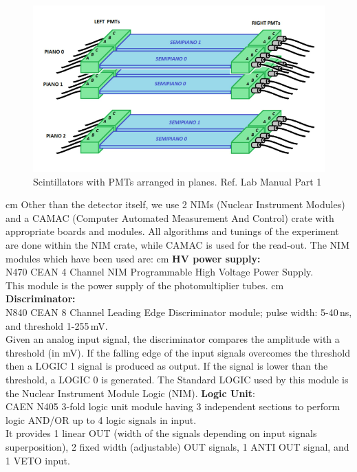	\begin{figure}
		\centering
		\includegraphics[width=1\textwidth]{figures/33.png}
		\caption{Scintillators with PMTs arranged in planes. Ref. Lab Manual Part 1}
		\label{fig:Setup}
	\end{figure}
	 cm
	Other than the detector itself, we use 2 NIMs (Nuclear Instrument Modules) and a 
    CAMAC (Computer Automated Measurement And Control) crate with appropriate boards and modules.
    All algorithms and tunings of the experiment are done within the NIM crate, while CAMAC is used
    for the read-out. The NIM modules which have been used are: 
	 cm
	\textbf{HV power supply:}\\ N470 CEAN 4 Channel NIM Programmable High Voltage
    Power Supply.\\
	This module is the power supply of the photomultiplier tubes.
	 cm
	\textbf{Discriminator:}\\ N840 CEAN 8 Channel Leading Edge Discriminator module; pulse width:
    5-40\,ns, and threshold 1-255\,mV.\\
	Given an analog input signal, the discriminator compares the amplitude with a threshold 
    (in mV). If the falling edge of the input signals overcomes the threshold
    then a LOGIC 1 signal is produced as output. If the signal is lower than the threshold,
    a LOGIC 0 is generated. The Standard LOGIC used by this module is the Nuclear Instrument
    Module Logic (NIM).
	\newpage
	\textbf{Logic Unit}:\\ CAEN N405 3-fold logic unit module having 3 independent sections to
    perform logic AND/OR up to 4 logic signals in input.\\
	It provides 1 linear OUT (width of the signals depending on input signals superposition),
    2 ﬁxed width (adjustable) OUT signals, 1 ANTI OUT signal, and 1 VETO input.
